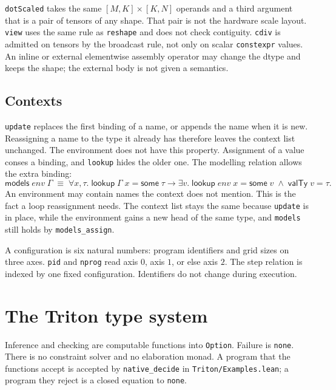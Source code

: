 \documentclass[a4paper,UKenglish,anonymous,cleveref,autoref]{lipics-v2021}
\begin{document}
\texttt{dotScaled} takes the same \([M,K]\times[K,N]\) operands and a third argument that is a pair of tensors of any shape.
That pair is not the hardware scale layout.
\texttt{view} uses the same rule as \texttt{reshape} and does not check contiguity.
\texttt{cdiv} is admitted on tensors by the broadcast rule, not only on scalar \texttt{constexpr} values.
An inline or external elementwise assembly operator may change the dtype and keeps the shape; the external body is not given a semantics.

\subsection{Contexts}

\texttt{update} replaces the first binding of a name, or appends the name when it is new.
Reassigning a name to the type it already has therefore leaves the context list unchanged.
The environment does not have this property.
Assignment of a value conses a binding, and \texttt{lookup} hides the older one.
The modelling relation allows the extra binding:
\[
\mathsf{models}\;\mathit{env}\;\Gamma
\;\equiv\;
\forall x,\tau.\;
\mathsf{lookup}\;\Gamma\;x = \mathsf{some}\;\tau
\rightarrow
\exists v.\;
\mathsf{lookup}\;\mathit{env}\;x = \mathsf{some}\;v
\;\wedge\;
\mathsf{valTy}\;v = \tau.
\]
An environment may contain names the context does not mention.
This is the fact a loop reassignment needs.
The context list stays the same because \texttt{update} is in place, while the environment gains a new head of the same type, and \texttt{models} still holds by \texttt{models\_assign}.

A configuration is six natural numbers: program identifiers and grid sizes on three axes.
\texttt{pid} and \texttt{nprog} read axis \(0\), axis \(1\), or else axis \(2\).
The step relation is indexed by one fixed configuration.
Identifiers do not change during execution.

\section{The Triton type system}
\label{sec:triton-ty}

Inference and checking are computable functions into \texttt{Option}.
Failure is \texttt{none}.
There is no constraint solver and no elaboration monad.
A program that the functions accept is accepted by \texttt{native\_decide} in \texttt{Triton/Examples.lean}; a program they reject is a closed equation to \texttt{none}.
\end{document}
